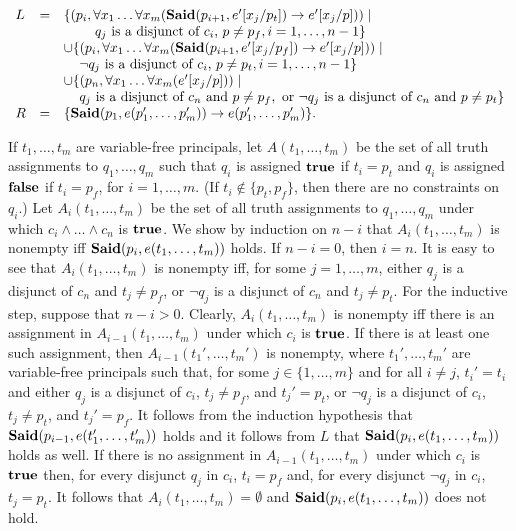 \documentclass{acmtrans2m}
\newcommand{\<}{
}
\renewcommand{\>}{\rangle}
\newcommand{\union}{\cup}
\newcommand{\Said}{\mathit{\bf Said}}
\newcommand{\true}{\mathit{\bf{true}}}
\newcommand{\false}{\mathit{\bf{false}}}
\newcommand{\vtab}{\phantom{Le}}
\newcommand{\cc}{e}
\newcommand{\imp}{\rightarrow}
\begin{document}
\[
\begin{array}{lll}
L &=& \{(p_i, \forall x_1 \ldots \forall x_m(\Said(p_{i+1},\cc'[x_j/p_t])\imp \cc'[x_j/p]))\mid \\
&&\vtab\vtab q_j \mbox{ is a disjunct of $c_i$, } p \ne p_f, i = 1, \ldots, n-1\}\\
&&\union \{(p_i, \forall x_1 \ldots \forall x_m(\Said(p_{i+1},\cc'[x_j/p_f])\imp \cc'[x_j/p]))\mid\\
&&\vtab \neg q_j \mbox{ is a disjunct of $c_i$, } p \ne p_t, i = 1, \ldots, n-1\}\\
&&\union \{(p_n, \forall x_1 \ldots \forall x_m(\cc'[x_j/p]))\mid\\
&&\vtab q_j \mbox{ is a disjunct of $c_n$ and } p \ne p_f, \mbox{ or }
\neg q_j \mbox{ is a disjunct of $c_n$ and } p \ne p_t\}\\
R &=& \{\Said(p_1, \cc(p'_1, \ldots, p'_m))\imp e(p'_1, \ldots, p'_m)\}.
\end{array}
\]

If $t_1, \ldots, t_m$ are variable-free principals, let $A(t_1, \ldots, t_m)$ be the set of all truth assignments to $q_1,\ldots, q_m$ such that $q_i$ is assigned $\true$ if $t_i = p_t$ and $q_i$ is assigned
$\false$ if $t_i = p_f$, for $i = 1,\ldots, m$.  (If $t_i \notin \{p_t, p_f\}$, then there are no constraints on $q_i$.)
Let $A_i(t_1, \ldots, t_m)$ be the set of all truth assignments to
$q_1,\ldots, q_m$ under which $c_i\land\ldots\land c_n$ is $\true$.  We
show by induction on $n-i$ that $A_i(t_1, \ldots, t_m)$ is nonempty iff
$\Said(p_i,\cc(t_1, \ldots, t_m))$ holds.  If $n-i =
0$, then $i = n$.  It is easy to see that $A_i(t_1, \ldots, t_m)$ is
nonempty iff, for some $j = 1, \ldots, m$, either $q_j$ is a disjunct of
$c_n$ and $t_j \ne p_f$, or $\neg q_j$ is a disjunct of $c_n$ and $t_j
\ne p_t$.  For the inductive step, suppose that $n-i > 0$.  Clearly,
$A_i(t_1, \ldots, t_m)$ is nonempty iff there is an assignment in
$A_{i-1}(t_1, \ldots, t_m)$ under which $c_i$ is $\true$.  If there is
at least one such assignment, then $A_{i-1}(t_1', \ldots, t_m')$ is
nonempty, where $t_1', \ldots, t_m'$ are variable-free principals such
that, for some $j \in \{1, \ldots, m\}$ and for all $i \ne j$, $t_i' =
t_i$ and either $q_j$ is a disjunct of $c_i$, $t_j \ne p_f$, and $t_j' =
p_t$, or $\neg q_j$ is a disjunct of $c_i$, $t_j \ne p_t$, and $t_j' =
p_f$.  It follows from the induction hypothesis that $\Said(p_{i-1},
e(t_1', \ldots, t_m'))$ holds and it follows from
$L$ that $\Said(p_{i}, e(t_1, \ldots, t_m))$ holds as well.  If there is no assignment in
$A_{i-1}(t_1, \ldots, t_m)$ under which $c_i$ is $\true$ then, for every disjunct $q_j$ in
$c_i$, $t_i = p_f$ and, for every disjunct $\neg q_j$ in $c_i$, $t_j = p_t$.  It follows that
$A_{i}(t_1, \ldots, t_m) = \emptyset$ and $\Said(p_i, e(t_1, \ldots, t_m))$ does not hold.
\end{document}
